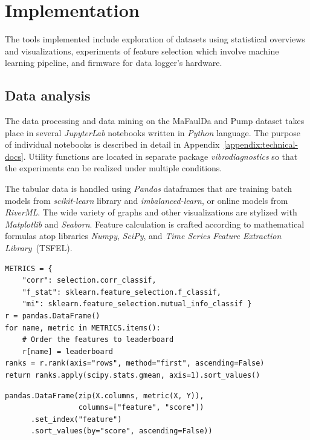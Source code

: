 \chapter{Implementation} \label{chapter:implementation}
The tools implemented include exploration of datasets using statistical overviews and visualizations, experiments of feature selection which involve machine learning pipeline, and firmware for data logger's hardware. 

\section{Data analysis}
The data processing and data mining on the MaFaulDa and Pump dataset takes place in several \emph{JupyterLab} notebooks written in \emph{Python} language. The purpose of individual notebooks is described in detail in Appendix~\ref{appendix:technical-docs}. Utility functions are located in separate package \emph{vibrodiagnostics} so that the experiments can be realized under multiple conditions.

The tabular data is handled using \emph{Pandas} dataframes that are training batch models from \emph{scikit-learn} library and \emph{imbalanced-learn}, or online models from \emph{RiverML}. The wide variety of graphs and other visualizations are stylized with \emph{Matplotlib} and \emph{Seaborn}. Feature calculation is crafted according to mathematical formulas atop libraries \emph{Numpy}, \emph{SciPy}, and \emph{Time Series Feature Extraction Library}~(TSFEL).

\begin{lstlisting}[style=pythonstyle,caption=Rank product of feature matrix X to label column Y,label={lst:rank-product},morekeywords={DataFrame,rank,set_index,sort_values,gmean}]
METRICS = {
    "corr": selection.corr_classif, 
    "f_stat": sklearn.feature_selection.f_classif, 
    "mi": sklearn.feature_selection.mutual_info_classif }
r = pandas.DataFrame()
for name, metric in METRICS.items():
    # Order the features to leaderboard
    r[name] = leaderboard  
ranks = r.rank(axis="rows", method="first", ascending=False)
return ranks.apply(scipy.stats.gmean, axis=1).sort_values()
\end{lstlisting}

\begin{lstlisting}[style=pythonstyle,caption=Leaderboard of feature importance metric scores,label={lst:feature-leaderboard},morekeywords={DataFrame,rank,set_index,sort_values,metric,gmean}]
pandas.DataFrame(zip(X.columns, metric(X, Y)), 
                 columns=["feature", "score"])
      .set_index("feature")
      .sort_values(by="score", ascending=False))
\end{lstlisting}

